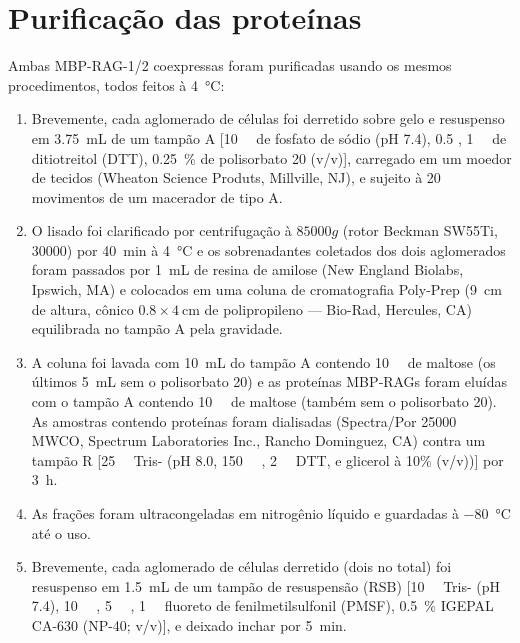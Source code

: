 \documentclass[
	12pt,				%
	openright,			%
	twoside,			%
	a4paper,			%
	]{abntex2}
\begin{document}
\section{Purificação das proteínas}

Ambas MBP-RAG-1/2 coexpressas foram purificadas usando os mesmos procedimentos, todos feitos à \SI{4}{\degreeCelsius}:
\begin{enumerate}[label=\roman*.]
	\item Brevemente, cada aglomerado de células foi derretido sobre gelo e resuspenso em \SI{3.75}{\milli\liter} de um tampão A [\SI{10}{\milli\molar} de fosfato de sódio (pH \num{7.4}), \SI{0.5}{\molar} , \SI{1}{\milli\molar} de ditiotreitol (DTT), \SI{0.25}{\percent} de polisorbato 20 (v/v)], carregado em um moedor de tecidos (Wheaton Science Produts, Millville, NJ), e sujeito à 20 movimentos de um macerador de tipo A.
	\item O lisado foi clarificado por centrifugação à $ \num{85000}g $ (rotor Beckman SW55Ti, \SI{30000}{\rpm}) por \SI{40}{\minute} à \SI{4}{\degreeCelsius} e os sobrenadantes coletados dos dois aglomerados foram passados por \SI{1}{\milli\liter} de resina de amilose (New England Biolabs, Ipswich, MA) e colocados em uma coluna de cromatografia Poly-Prep (\SI{9}{\centi\meter} de altura, cônico $ \num{0.8} \times \SI{4}{\centi\meter} $ de polipropileno --- Bio-Rad, Hercules, CA) equilibrada no tampão A pela gravidade.
	\item A coluna foi lavada com \SI{10}{\milli\liter} do tampão A contendo \SI{10}{\milli\molar} de maltose (os últimos \SI{5}{\milli\liter} sem o polisorbato 20) e as proteínas MBP‐RAGs foram eluídas com o tampão A contendo \SI{10}{\milli\molar} de maltose (também sem o polisorbato 20). As amostras contendo proteínas foram dialisadas (Spectra/Por \num{25000} MWCO, Spectrum Laboratories Inc., Rancho Dominguez, CA) contra um tampão R [\SI{25}{\milli\molar} Tris- (pH \num{8.0}, \SI{150}{\milli\molar} , \SI{2}{\milli\molar} DTT, e glicerol à 10\% (v/v))] por \SI{3}{\hour}.
	\item As frações foram ultracongeladas em nitrogênio líquido e guardadas à \SI{-80}{\degreeCelsius} até o uso.
	\item Brevemente, cada aglomerado de células derretido (dois no total) foi resuspenso em \SI{1.5}{\milli\liter} de um tampão de resuspensão (RSB) [\SI{10}{\milli\molar} Tris- (pH \num{7.4}), \SI{10}{\milli\molar} , \SI{5}{\milli\molar} , \SI{1}{\milli\molar} fluoreto de fenilmetilsulfonil (PMSF), \SI{0.5}{\percent} IGEPAL CA-630 (NP-40; v/v)], e deixado inchar por \SI{5}{\minute}.

\end{enumerate}
\end{document}
